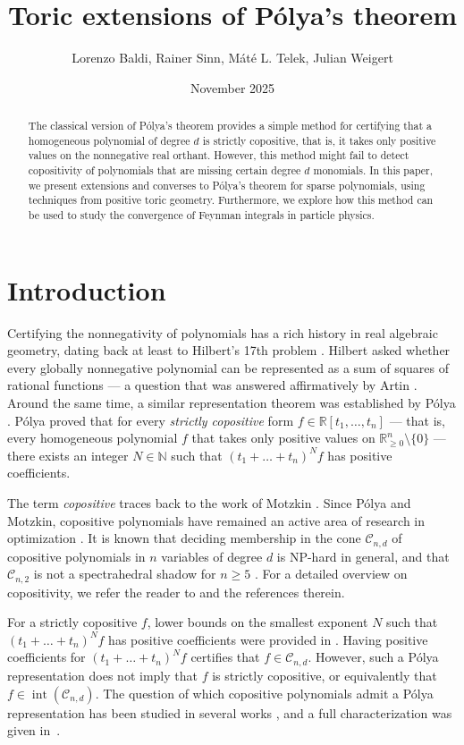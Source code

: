 \documentclass[a4paper,11pt]{amsart}
\title{Toric extensions of Pólya's theorem}
\author{Lorenzo Baldi, Rainer Sinn, Máté L. Telek, Julian Weigert}
\date{November 2025}
\theoremstyle{definition}
\DeclareMathOperator{\interior}{int}
\newcommand{\NN}{\mathbb{N}}
\newcommand{\RR}{\mathbb{R}}
\newcommand{\cC}{\mathcal{C}}
\begin{document}
\begin{abstract}
The classical version of Pólya's theorem provides a simple method for certifying that a homogeneous polynomial of degree $d$ is strictly copositive, that is, it takes only positive values on the nonnegative real orthant. However, this method might fail to detect copositivity of polynomials that are missing certain degree $d$ monomials. In this paper, we present extensions and converses to Pólya's theorem for sparse polynomials, using techniques from positive toric geometry. Furthermore, we explore how this method can be used to study the convergence of Feynman integrals in particle physics.
\end{abstract}

\maketitle

\section{Introduction}
Certifying the nonnegativity of polynomials has a rich history in real algebraic geometry, dating back at least to Hilbert's 17th problem \cite{Hilbert}. Hilbert asked whether every globally nonnegative polynomial can be represented as a sum of squares of rational functions --- a question that was answered affirmatively by Artin \cite{Artin}. Around the same time, a similar representation theorem was established by Pólya \cite{Polya}. Pólya proved that for every \emph{strictly copositive} form $f \in \RR[t_1,\dots,t_n]$ --- that is, every homogeneous polynomial $f$ that takes only positive values on $\RR^n_{\geq0}\setminus \{0\}$ --- there exists an integer $N \in \NN$ such that $(t_1+\dots+t_n)^Nf$ has positive coefficients.

The term \emph{copositive} traces back to the work of Motzkin \cite{Motzkin}. Since Pólya and Motzkin, copositive polynomials have remained an active area of research in optimization \cite{BomzeDur,Dur}. It is known that deciding membership in the cone $\cC_{n,d}$ of copositive polynomials in $n$ variables of degree $d$ is NP-hard in general, and that $\cC_{n,2}$ is not a spectrahedral shadow for $n \geq 5$ \cite{BodirskyKummerThom}. For a detailed overview on copositivity, we refer the reader to \cite{Vargas,Parrilo} and the references therein.

For a strictly copositive $f$, lower bounds on the smallest exponent $N$ such that $(t_1+ \dots + t_n)^N f$ has positive coefficients were provided in \cite{PowersReznick,deLoeraSantos}.
Having  positive coefficients for $(t_1+ \dots + t_n)^N f$ certifies that $f \in \cC_{n,d}$.
However, such a Pólya representation does not imply that $f$ is strictly copositive, or equivalently that $f \in \interior(\cC_{n,d})$.
The question of which copositive polynomials admit a Pólya representation has been studied in several works \cite{PowersReznick2006,CastlePowersReznick2009,MokTo,Burgdorf2012}, and a full characterization was given in~\cite{CastlePowersReznick}.
\end{document}
